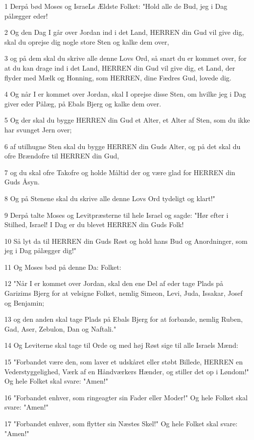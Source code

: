 \par 1 Derpå bød Moses og IsraeLs Ældste Folket: "Hold alle de Bud, jeg i Dag pålægger eder!
\par 2 Og den Dag I går over Jordan ind i det Land, HERREN din Gud vil give dig, skal du oprejse dig nogle store Sten og kalke dem over,
\par 3 og på dem skal du skrive alle denne Lovs Ord, så snart du er kommet over, for at du kan drage ind i det Land, HERREN din Gud vil give dig, et Land, der flyder med Mælk og Honning, som HERREN, dine Fædres Gud, lovede dig.
\par 4 Og når I er kommet over Jordan, skal I oprejse disse Sten, om hvilke jeg i Dag giver eder Pålæg, på Ebals Bjerg og kalke dem over.
\par 5 Og der skal du bygge HERREN din Gud et Alter, et Alter af Sten, som du ikke har svunget Jern over;
\par 6 af utilhugne Sten skal du bygge HERREN din Guds Alter, og på det skal du ofre Brændofre til HERREN din Gud,
\par 7 og du skal ofre Takofre og holde Måltid der og være glad for HERREN din Guds Åsyn.
\par 8 Og på Stenene skal du skrive alle denne Lovs Ord tydeligt og klart!"
\par 9 Derpå talte Moses og Levitpræsterne til hele Israel og sagde: "Hør efter i Stilhed, Israel! I Dag er du blevet HERREN din Guds Folk!
\par 10 Så lyt da til HERREN din Guds Røst og hold hans Bud og Anordninger, som jeg i Dag pålægger dig!"
\par 11 Og Moses bød på denne Da: Folket:
\par 12 "Når I er kommet over Jordan, skal den ene Del af eder tage Plads på Garizims Bjerg for at velsigne Folket, nemlig Simeon, Levi, Juda, Issakar, Josef og Benjamin;
\par 13 og den anden skal tage Plads på Ebals Bjerg for at forbande, nemlig Ruben, Gad, Aser, Zebulon, Dan og Naftali."
\par 14 Og Leviterne skal tage til Orde og med høj Røst sige til alle Israels Mænd:
\par 15 "Forbandet være den, som laver et udskåret eller støbt Billede, HERREN en Vederstyggelighed, Værk af en Håndværkers Hænder, og stiller det op i Løndom!" Og hele Folket skal svare: "Amen!"
\par 16 "Forbandet enhver, som ringeagter sin Fader eller Moder!" Og hele Folket skal svare: "Amen!"
\par 17 "Forbandet enhver, som flytter sin Næstes Skel!" Og hele Folket skal svare: "Amen!"
